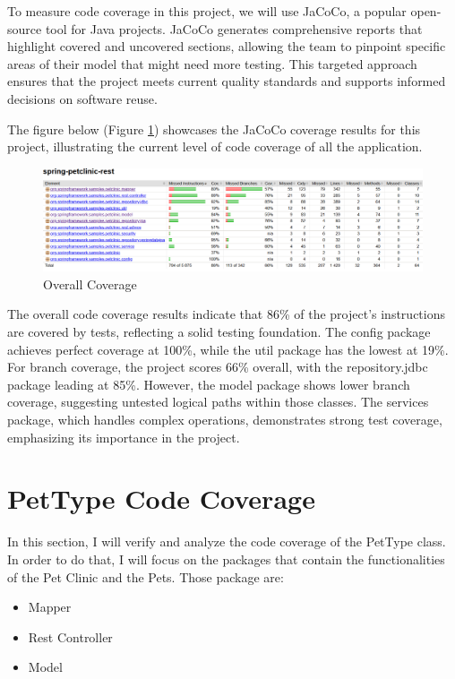 \documentclass[a4paper,11pt,openright,BCOR=15mm]{scrbook}
\begin{document}
		To measure code coverage in this project, we will use JaCoCo, a popular open-source tool for Java projects. JaCoCo generates comprehensive reports that highlight covered and uncovered sections, allowing the team to pinpoint specific areas of their model that might need more testing. This targeted approach ensures that the project meets current quality standards and supports informed decisions on software reuse.
		
		
		\newpage
		The figure below (Figure \ref{fig:Overall Report}) showcases the JaCoCo coverage results for this project, illustrating the current level of code coverage of all the application.
		\vspace{1em}
		
		\begin{figure}[H]
			\centering
			\includegraphics[width=\textwidth]{figs/Funcional Correctness/overall report.png}
			\caption{Overall Coverage}
			\label{fig:Overall Report}
		\end{figure}
		\vspace{1em}
		
		The overall code coverage results indicate that 86\%  of the project's instructions are covered by tests, reflecting a solid testing foundation. The config package achieves perfect coverage at 100\%, while the util package has the lowest at 19\%. For branch coverage, the project scores 66\% overall, with the repository.jdbc package leading at 85\%. However, the model package shows lower branch coverage, suggesting untested logical paths within those classes. The services package, which handles complex operations, demonstrates strong test coverage, emphasizing its importance in the project.
		
		
		
		
		\section{PetType Code Coverage}
		In this section, I will verify and analyze the code coverage of the PetType class. In order to do that, I will focus on the packages that contain the functionalities of the Pet Clinic and the Pets. Those package are:
		\begin{itemize}
			\item Mapper
			\item Rest Controller
			\item Model
		\end{itemize} 
		
\end{document}
